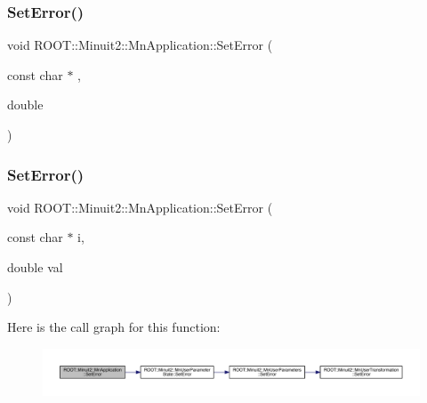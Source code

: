 \subsubsection{\texorpdfstring{SetError()}{SetError()}\hspace{0.1cm}{\footnotesize\ttfamily [3/4]}}
{\footnotesize\ttfamily void R\+O\+O\+T\+::\+Minuit2\+::\+Mn\+Application\+::\+Set\+Error (\begin{DoxyParamCaption}\item[{const char $\ast$}]{,  }\item[{double}]{ }\end{DoxyParamCaption})}

\mbox{\label{classROOT_1_1Minuit2_1_1MnApplication_ac47d9b0517cbc38dc0237e4dc654a807}} 
\subsubsection{\texorpdfstring{SetError()}{SetError()}\hspace{0.1cm}{\footnotesize\ttfamily [4/4]}}
{\footnotesize\ttfamily void R\+O\+O\+T\+::\+Minuit2\+::\+Mn\+Application\+::\+Set\+Error (\begin{DoxyParamCaption}\item[{const char $\ast$}]{i,  }\item[{double}]{val }\end{DoxyParamCaption})}

Here is the call graph for this function\+:\nopagebreak
\begin{figure}[H]
\begin{center}
\leavevmode
\includegraphics[width=350pt]{df/dd5/classROOT_1_1Minuit2_1_1MnApplication_ac47d9b0517cbc38dc0237e4dc654a807_cgraph}
\end{center}
\end{figure}
\mbox{\label{classROOT_1_1Minuit2_1_1MnApplication_ad6c07174e01b117cb67a43211753ae06}} 
